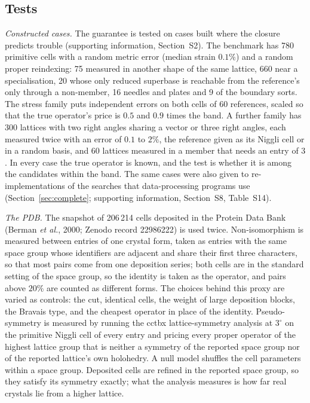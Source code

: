 \subsection{Tests}
\label{sec:design}
\emph{Constructed cases.} The guarantee is tested on cases built where the closure predicts trouble (supporting information, Section~S2). The benchmark has 780 primitive cells with a random metric error (median strain $0.1\%$) and a random proper reindexing: 75 measured in another shape of the same lattice, 660 near a specialisation, 20 whose only reduced superbase is reachable from the reference's only through a non-member, 16 needles and plates and 9 of the boundary sorts. The stress family puts independent errors on both cells of 60 references, scaled so that the true operator's price is $0.5$ and $0.9$ times the band. A further family has 300 lattices with two right angles sharing a vector or three right angles, each measured twice with an error of $0.1$ to $2\%$, the reference given as its Niggli cell or in a random basis, and 60 lattices measured in a member that needs an entry of $3$. In every case the true operator is known, and the test is whether it is among the candidates within the band. The same cases were also given to re-implementations of the searches that data-processing programs use (Section~\ref{sec:complete}; supporting information, Section~S8, Table~S14).

\emph{The PDB.} The snapshot of 206\,214 cells deposited in the Protein Data Bank (Berman \emph{et al.}, 2000; Zenodo record 22986222) is used twice. Non-isomorphism is measured between entries of one crystal form, taken as entries with the same space group whose identifiers are adjacent and share their first three characters, so that most pairs come from one deposition series; both cells are in the standard setting of the space group, so the identity is taken as the operator, and pairs above $20\%$ are counted as different forms. The choices behind this proxy are varied as controls: the cut, identical cells, the weight of large deposition blocks, the Bravais type, and the cheapest operator in place of the identity. Pseudo-symmetry is measured by running the cctbx lattice-symmetry analysis at $3^\circ$ on the primitive Niggli cell of every entry and pricing every proper operator of the highest lattice group that is neither a symmetry of the reported space group nor of the reported lattice's own holohedry. A null model shuffles the cell parameters within a space group. Deposited cells are refined in the reported space group, so they satisfy its symmetry exactly; what the analysis measures is how far real crystals lie from a higher lattice.

